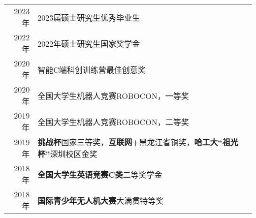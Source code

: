 %
%




\begin{tabular}{rl}	
	2023年 & 2023届硕士研究生优秀毕业生\\
	2022年 & 2022年硕士研究生国家奖学金 \\
	2020年 & 智能C端科创训练营最佳创意奖\\
	2020年 & 全国大学生机器人竞赛ROBOCON，一等奖\\
	2019年 & 全国大学生机器人竞赛ROBOCON，二等奖\\
	2019年 & \textbf{挑战杯}国家三等奖，\textbf{互联网+}黑龙江省铜奖，\textbf{哈工大“祖光杯”}深圳校区金奖\\
	2018年 & \textbf{全国大学生英语竞赛C类}二等奖学金\\
	2018年 & \textbf{国际青少年无人机大赛}大满贯特等奖
\end{tabular}

